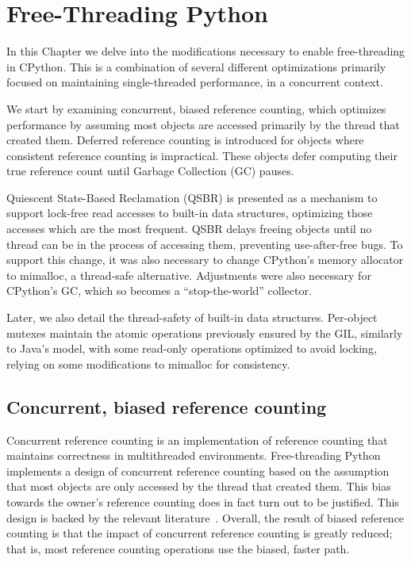 \chapter{Free-Threading Python}\label{ch:free-threading-python}

In this Chapter we delve into the modifications necessary to enable free-threading in CPython.
This is a combination of several different optimizations primarily focused on maintaining single-threaded performance, in a concurrent context.

We start by examining concurrent, biased reference counting, which optimizes performance by assuming most objects are accessed primarily by the thread that created them.
Deferred reference counting is introduced for objects where consistent reference counting is impractical.
These objects defer computing their true reference count until Garbage Collection (GC) pauses.

Quiescent State-Based Reclamation (QSBR) is presented as a mechanism to support lock-free read accesses to built-in data structures, optimizing those accesses which are the most frequent.
QSBR delays freeing objects until no thread can be in the process of accessing them, preventing use-after-free bugs.
To support this change, it was also necessary to change CPython's memory allocator to mimalloc, a thread-safe alternative.
Adjustments were also necessary for CPython's GC, which so becomes a ``stop-the-world'' collector.

Later, we also detail the thread-safety of built-in data structures.
Per-object mutexes maintain the atomic operations previously ensured by the GIL, similarly to Java's model, with some read-only operations optimized to avoid locking, relying on some modifications to mimalloc for consistency.


\section{Concurrent, biased reference counting}\label{sec:concurrent-biased-reference-counting}

Concurrent reference counting is an implementation of reference counting that maintains correctness in multithreaded environments.
Free-threading Python implements a design of concurrent reference counting based on the assumption that most objects are only accessed by the thread that created them.
This bias towards the owner's reference counting does in fact turn out to be justified.
This design is backed by the relevant literature~\cite{biased-refcounting}.
Overall, the result of biased reference counting is that the impact of concurrent reference counting is greatly reduced; that is, most reference counting operations use the biased, faster path.

